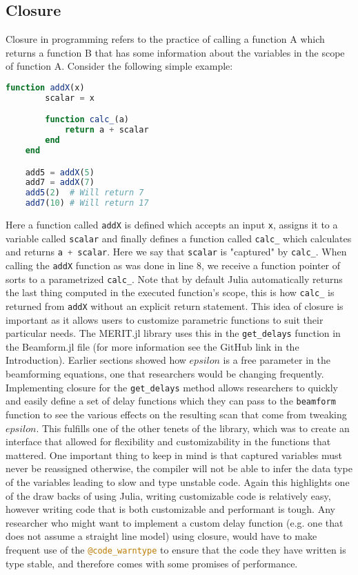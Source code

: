 \subsection{Closure}
Closure in programming refers to the practice of calling a function A which returns a function B that has some
information about the variables in the scope of function A. Consider the following simple example:
\begin{lstlisting}[language=Julia]
    function addX(x)
        scalar = x

        function calc_(a)
            return a + scalar
        end
    end

    add5 = addX(5)
    add7 = addX(7)
    add5(2)  # Will return 7
    add7(10) # Will return 17
\end{lstlisting}
Here a function called \lstinline[language=Julia]{addX} is defined which accepts an input \lstinline[language=Julia]{x},
assigns it to a variable called \lstinline[language=Julia]{scalar} and finally defines a function called
\lstinline[language=Julia]{calc_} which calculates and returns \lstinline[language=Julia]{a + scalar}. Here we say that
\lstinline[language=Julia]{scalar} is "captured" by \lstinline[language=Julia]{calc_}. When calling the
\lstinline[language=Julia]{addX} function as was done in line 8, we receive a function pointer of sorts to a
parametrized \lstinline[language=Julia]{calc_}. Note that by default Julia automatically returns the last thing computed
in the executed function's scope, this is how \lstinline[language=Julia]{calc_} is returned from
\lstinline[language=Julia]{addX} without an explicit return statement. This idea of closure is important as it allows
users to customize parametric functions to suit their particular needs. The MERIT.jl library uses this in the
\lstinline[language=Julia]{get_delays} function in the Beamform.jl file (for more information see the GitHub link in
the Introduction). Earlier sections showed
how $epsilon$ is a free parameter in the beamforming equations, one that researchers would be changing frequently.
Implementing closure for the \lstinline[language=Julia]{get_delays} method allows researchers to quickly and easily
define a set of delay functions which they can pass to the \lstinline[language=Julia]{beamform} function to see the
various effects on the resulting scan that come from tweaking $epsilon$. This fulfills one of the other tenets of the
library, which was to create an interface that allowed for flexibility and customizability in the functions that
mattered. One important thing to keep in mind is that captured variables must never be reassigned otherwise, the
compiler will not be able to infer the data type of the variables leading to slow and type unstable code. Again this
highlights one of the draw backs of using Julia, writing customizable code is relatively easy, however writing code that
is both customizable and performant is tough. Any researcher who might want to implement a custom delay function (e.g.
one that does not assume a straight line model) using closure, would have to make frequent use of the
\lstinline[language=Julia]{@code_warntype} to ensure that the code they have written is type stable, and therefore comes
with some promises of performance.  

